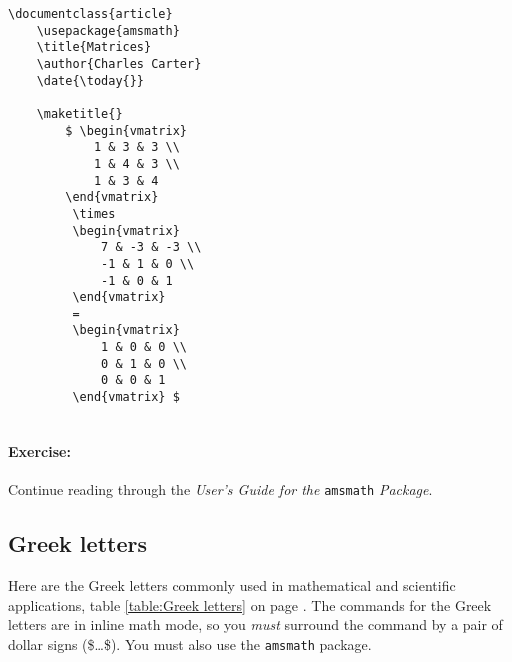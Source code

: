         \begin{verbatim}
\documentclass{article}
    \usepackage{amsmath}
    \title{Matrices}
    \author{Charles Carter}
    \date{\today{}}
 
    \maketitle{}
        $ \begin{vmatrix}
            1 & 3 & 3 \\
            1 & 4 & 3 \\
            1 & 3 & 4 
        \end{vmatrix}
         \times 
         \begin{vmatrix}
             7 & -3 & -3 \\
             -1 & 1 & 0 \\
             -1 & 0 & 1
         \end{vmatrix}
         =
         \begin{vmatrix}
             1 & 0 & 0 \\
             0 & 1 & 0 \\
             0 & 0 & 1
         \end{vmatrix} $
    
        \end{verbatim}

		\paragraph{Exercise:}Continue reading through the \textit{User's Guide for the }\texttt{amsmath} \textit{Package}.

        \subsection{Greek letters}
        \label{Greek letters}
        
        Here are the Greek letters commonly used in mathematical and scientific applications, table \ref{table:Greek letters} on page \pageref{table:Greek letters}. The \Lx{} commands for the Greek letters are in inline math mode, so you \textit{must} surround the command by a pair of dollar signs (\$\ldots\$). You must also use the \texttt{amsmath} package.

